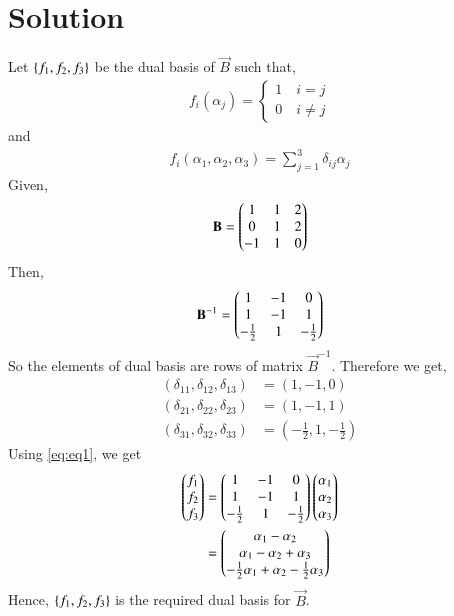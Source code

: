 \documentclass[journal,12pt,twocolumn]{IEEEtran}
\begin{document}
\section{Solution}
Let $\left\{f_1, f_2, f_3\right\}$ be the dual basis of $\vec{B}$ such that,
\begin{align}
	f_i(\alpha_j) = \begin{cases}
		1 \quad i = j\\
		0 \quad i \not= j
	\end{cases}
\end{align}
and 
\begin{align}
	f_i(\alpha_1, \alpha_2, \alpha_3) = \sum_{j=1}^{3} \delta_{ij}\alpha_j \label{eq:eq1}
\end{align}
Given,
\begin{align}
	\mathbf{B} = \begin{pmatrix}1 & 1 & 2\\ 0 & 1& 2 \\ -1 & 1& 0\end{pmatrix}
\end{align}
Then, 
\begin{align}
	\mathbf{B}^{-1} = \begin{pmatrix}1  & -1 & 0\\ 1 & -1 & 1\\ -\frac{1}{2} & 1 & -\frac{1}{2}\end{pmatrix}
\end{align}
So the elements of dual basis are rows of matrix $\vec{B}^{-1}$.
Therefore we get, 
\begin{align}
	(\delta_{11}, \delta_{12}, \delta_{13} ) &= (1, -1, 0)\\
	(\delta_{21}, \delta_{22}, \delta_{23} ) &= (1, -1, 1)\\
	(\delta_{31}, \delta_{32}, \delta_{33} ) &= (-\frac{1}{2}, 1, -\frac{1}{2})
\end{align}
Using \eqref{eq:eq1}, we get 
\begin{align}
	\begin{pmatrix}f_1 \\ f_2 \\ f_3\end{pmatrix} &= \begin{pmatrix}1  & -1 & 0\\ 1 & -1 & 1\\ -\frac{1}{2} & 1 & -\frac{1}{2}\end{pmatrix} \begin{pmatrix}\alpha_1 \\ \alpha_2\\ \alpha_3\end{pmatrix}\\
	&= \begin{pmatrix}\alpha_1 - \alpha_2 \\ \alpha_1 - \alpha_2 + \alpha_3\\ -\frac{1}{2}\alpha_1 + \alpha_2 -\frac{1}{2} \alpha_3\end{pmatrix}
\end{align}
Hence, $\left\{f_1, f_2, f_3\right\}$ is the required dual basis for $\vec{B}$.
\end{document}
